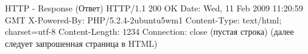 \begin{frame}{HTTP - Response (Ответ)}
HTTP/1.1 200 OK \newline
Date: Wed, 11 Feb 2009 11:20:59 GMT \newline
X-Powered-By: PHP/5.2.4-2ubuntu5wm1\newline
Content-Type: text/html; charset=utf-8\newline
Content-Length: 1234\newline
Connection: close\newline
(пустая строка)\newline
(далее следует запрошенная страница в HTML)\newline
\newline
\end{frame}